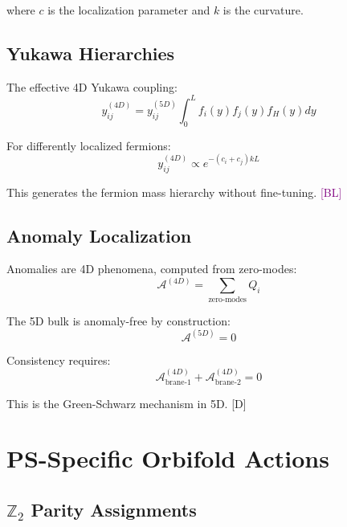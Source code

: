 \documentclass[11pt,a4paper]{article}
\newcommand{\tagD}{\textcolor{blue!70!black}{[D]}}
\newcommand{\tagBL}{\textcolor{purple}{[BL]}}
\begin{document}
where $c$ is the localization parameter and $k$ is the curvature.

\subsection{Yukawa Hierarchies}

The effective 4D Yukawa coupling:
\begin{equation}
\label{eq:yukawa-overlap}
y_{ij}^{(4D)} = y_{ij}^{(5D)} \int_0^L f_i(y) f_j(y) f_H(y) dy
\end{equation}

For differently localized fermions:
\begin{equation}
\label{eq:yukawa-exponential}
y_{ij}^{(4D)} \propto e^{-(c_i + c_j) k L}
\end{equation}

This generates the fermion mass hierarchy without fine-tuning. \tagBL

\subsection{Anomaly Localization}

Anomalies are 4D phenomena, computed from zero-modes:
\begin{equation}
\label{eq:anom-4d}
\mathcal{A}^{(4D)} = \sum_{\text{zero-modes}} Q_i
\end{equation}

The 5D bulk is anomaly-free by construction:
\begin{equation}
\label{eq:bulk-safe}
\mathcal{A}^{(5D)} = 0
\end{equation}

Consistency requires:
\begin{equation}
\label{eq:anom-inflow}
\mathcal{A}^{(4D)}_{\text{brane-1}} + \mathcal{A}^{(4D)}_{\text{brane-2}} = 0
\end{equation}

This is the Green-Schwarz mechanism in 5D. \tagD

\section{PS-Specific Orbifold Actions}
\label{app:orbifold}

\subsection{$\mathbb{Z}_2$ Parity Assignments}
\end{document}
